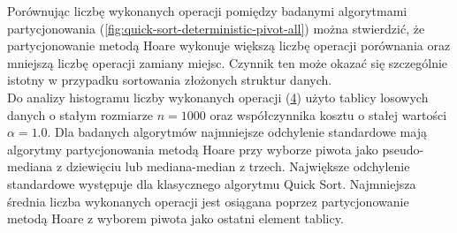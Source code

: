 Porównując liczbę wykonanych operacji pomiędzy badanymi algorytmami partycjonowania (\ref{fig:quick-sort-deterministic-pivot-all}) można stwierdzić, że partycjonowanie metodą Hoare wykonuje większą liczbę operacji porównania oraz mniejszą liczbę operacji zamiany miejsc. Czynnik ten może okazać się szczególnie istotny w przypadku sortowania złożonych struktur danych.\\

Do analizy histogramu liczby wykonanych operacji (\ref{fig:quick-sort-deterministic-pivot-density}) użyto tablicy losowych danych o stałym rozmiarze $n = 1000$ oraz współczynnika kosztu o stałej wartości $\alpha = 1.0$. Dla badanych algorytmów najmniejsze odchylenie standardowe mają algorytmy partycjonowania metodą Hoare przy wyborze piwota jako pseudo-mediana z dziewięciu lub mediana-median z trzech. Największe odchylenie standardowe występuje dla klasycznego algorytmu Quick Sort. Najmniejsza średnia liczba wykonanych operacji jest osiągana poprzez partycjonowanie metodą Hoare z wyborem piwota jako ostatni element tablicy.


\begin{figure}[]
	\centering
	
	\caption[]{}
	\label{fig:quick-sort-deterministic-pivot-random}
\end{figure}

\begin{figure}[]
	\centering
	
	\caption[]{}
	\label{fig:quick-sort-deterministic-pivot-reversed}
\end{figure}

\begin{figure}[]
	\centering
	
	\caption[]{}
	\label{fig:quick-sort-deterministic-pivot-cost-factor}
\end{figure}

\begin{figure}[]
	\centering
	
	\caption[]{}
	\label{fig:quick-sort-deterministic-pivot-density}
\end{figure}


